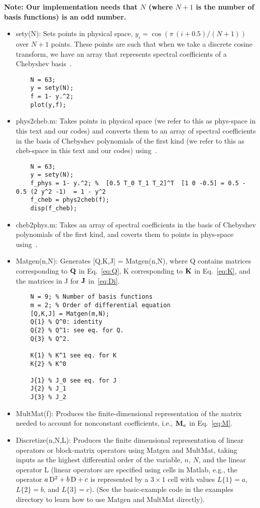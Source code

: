 \documentclass[%
secnumarabic,%
 amssymb, amsmath,%
 aps,prf,superscriptaddress,longbibliography
frontmatterverbose,
]{revtex4-2}
\begin{document}
\textbf{Note: Our implementation needs that $N$ (where $N+1$ is the number of basis functions) is an odd number.}
\begin{itemize}
  \item \textsf{sety(N)}: Sets points in physical space, $y_i = \cos (\pi \,(i + 0.5) / (N + 1))$ over $N + 1$ points. These points are such that when we take a discrete cosine transform, we have an array that represents spectral coefficients of a Chebyshev basis~\cite[Eq. 12.4.16-17]{NumRecipes}.
  \begin{lstlisting}
    N = 63;
    y = sety(N);
    f = 1- y.^2;
    plot(y,f);
  \end{lstlisting}
  \item \textsf{phys2cheb.m}: Takes points in physical space (we refer to this as phys-space in this text and our codes) and converts them to an array of spectral coefficients in the basis of Chebyshev polynomials of the first kind (we refer to this as cheb-space in this text and our codes) using~\cite[Eq. 12.4.16-17]{NumRecipes}.
  \begin{lstlisting}
    N = 63;
    y = sety(N);
    f_phys = 1- y.^2; %  [0.5 T_0 T_1 T_2]^T  [1 0 -0.5] = 0.5 - 0.5 (2 y^2 -1)  = 1 - y^2
    f_cheb = phys2cheb(f);
    disp(f_cheb);
  \end{lstlisting}
  \item \textsf{cheb2phys.m}: Takes an array of spectral coefficients in the basis of Chebyshev polynomials of the first kind, and coverts them to points in phys-space using~\cite[Eq. 12.4.16-17]{NumRecipes}.
  \item \textsf{Matgen(n,N)}: Generates \textsf{[Q,K,J] = Matgen(n,N)}, where \textsf{Q} contains matrices corresponding to $\mathbf{Q}$ in Eq.~\eqref{eq:Q}, \textsf{K} corresponding to $\mathbf{K}$ in Eq.~\eqref{eq:K}, and the matrices in \textsf{J} for $\mathbf{J}$ in~\eqref{eq:Di}.
  \begin{lstlisting}
    N = 9; % Number of basis functions
    m = 2; % Order of differential equation
    [Q,K,J] = Matgen(m,N);
    Q{1} % Q^0: identity
    Q{2} % Q^1: see eq. for Q.
    Q{3} % Q^2.
    
    K{1} % K^1 see eq. for K
    K{2} % K^0
    
    J{1} % J_0 see eq. for J
    J{2} % J_1
    J{3} % J_2
  \end{lstlisting}
  \item \textsf{MultMat(f)}: Produces the finite-dimensional representation of the matrix needed to account for nonconstant coefficients, i.e., $\mathbf{M}_a$ in Eq.~\eqref{eq:M}.
  \item \textsf{Discretize(n,N,L)}: Produces the finite dimensional representation of linear operators or block-matrix operators using \textsf{Matgen} and \textsf{MultMat}, taking inputs as the highest differential order of the variable, $n$, $N$, and the linear operator L (linear operators are specified using cells in Matlab, e.g., the operator $a\,\mathrm D^2 + b\,\mathrm D + c$ is represented by a $3\times 1$ cell with values $L\{1\} = a$, $L\{2\} = b$, and $L\{3\} = c$). (See the basic-example code in the examples directory to learn how to use \textsf{Matgen} and \textsf{MultMat} directly).
 

\end{itemize}
\end{document}
